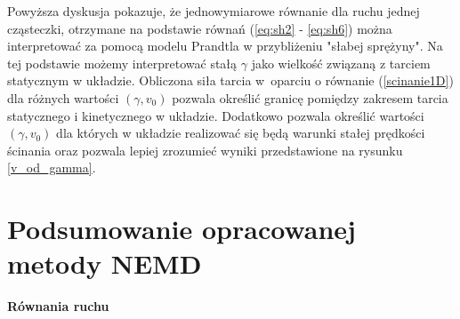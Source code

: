 \documentclass[12pt,a4paper,openright]{report} %
\begin{document}
Powyższa dyskusja pokazuje, że jednowymiarowe równanie dla ruchu jednej cząsteczki, otrzymane na podstawie równań (\ref{eq:sh2} - \ref{eq:sh6}) można interpretować za pomocą modelu Prandtla w przybliżeniu "słabej sprężyny". Na tej podstawie możemy interpretować stałą $\gamma$ jako wielkość związaną z tarciem statycznym w układzie. Obliczona siła tarcia w~oparciu o równanie (\ref{scinanie1D}) dla różnych wartości $(\gamma, v_0)$ pozwala określić granicę pomiędzy zakresem tarcia statycznego i kinetycznego w układzie. Dodatkowo pozwala określić wartości $(\gamma, v_0)$ dla których w układzie realizować się będą warunki stałej prędkości ścinania oraz pozwala lepiej zrozumieć wyniki przedstawione na rysunku \ref{v_od_gamma}.
%
%
%
%
\section{Podsumowanie opracowanej metody NEMD}
\noindent
\textbf{Równania ruchu}
\end{document}
